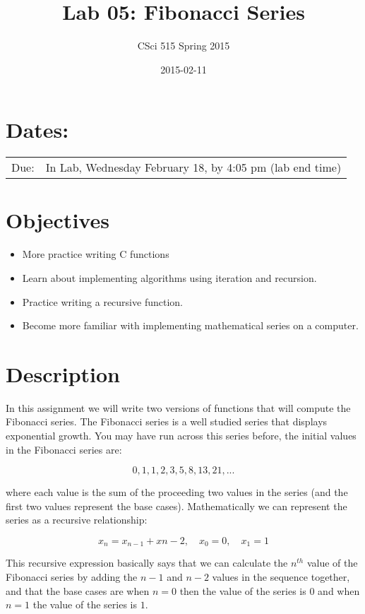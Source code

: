 \documentclass[11pt]{article}
\title{Lab 05: Fibonacci Series}
\author{CSci 515 Spring 2015}
\date{2015-02-11}
\begin{document}
\maketitle


\section*{Dates:}
\label{sec-1}


\begin{center}
\begin{tabular}{ll}
 Due:  &  In Lab, Wednesday February 18, by 4:05 pm (lab end time)  \\
\end{tabular}
\end{center}
\section*{Objectives}
\label{sec-2}

\begin{itemize}
\item More practice writing C functions
\item Learn about implementing algorithms using iteration and recursion.
\item Practice writing a recursive function.
\item Become more familiar with implementing mathematical series on a computer.
\end{itemize}
\section*{Description}
\label{sec-3}

In this assignment we will write two versions of functions that will
compute the Fibonacci series.  The Fibonacci series is a well studied
series that displays exponential growth.  You may have run across this
series before, the initial values in the Fibonacci series are:

$$
0, 1, 1, 2, 3, 5, 8, 13, 21, ...
$$

where each value is the sum of the proceeding two values in the series
(and the first two values represent the base cases).  Mathematically
we can represent the series as a recursive relationship:

$$
x_n = x_{n-1} + x{n-2}, \quad x_0 = 0, \quad x_1 = 1
$$

This recursive expression basically says that we can calculate the
$n^{th}$ value of the Fibonacci series by adding the $n-1$ and $n-2$
values in the sequence together, and that the base cases are when $n=0$
then the value of the series is $0$ and when $n=1$ the value of the
series is $1$.
\end{document}
